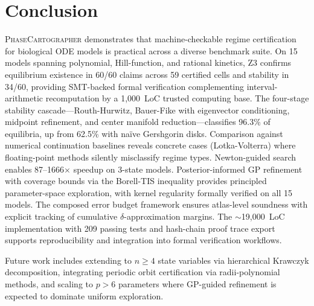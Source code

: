 \documentclass[11pt]{article}
\newcommand{\PC}{\textsc{PhaseCartographer}}
\begin{document}
\section{Conclusion}
\label{sec:conclusion}

\PC{} demonstrates that machine-checkable regime certification for biological ODE models is practical across a diverse benchmark suite.
On 15 models spanning polynomial, Hill-function, and rational kinetics, Z3 confirms equilibrium existence in 60/60 claims across 59 certified cells and stability in 34/60, providing SMT-backed formal verification complementing interval-arithmetic recomputation by a 1{,}000~LoC trusted computing base.
The four-stage stability cascade---Routh-Hurwitz, Bauer-Fike with eigenvector conditioning, midpoint refinement, and center manifold reduction---classifies 96.3\% of equilibria, up from 62.5\% with na\"ive Gershgorin disks.
Comparison against numerical continuation baselines reveals concrete cases (Lotka-Volterra) where floating-point methods silently misclassify regime types.
Newton-guided search enables 87--1666$\times$ speedup on 3-state models.
Posterior-informed GP refinement with coverage bounds via the Borell-TIS inequality provides principled parameter-space exploration, with kernel regularity formally verified on all 15 models.
The composed error budget framework ensures atlas-level soundness with explicit tracking of cumulative $\delta$-approximation margins.
The ${\sim}$19{,}000~LoC implementation with 209 passing tests and hash-chain proof trace export supports reproducibility and integration into formal verification workflows.

Future work includes extending to $n \geq 4$ state variables via hierarchical Krawczyk decomposition, integrating periodic orbit certification via radii-polynomial methods, and scaling to $p > 6$ parameters where GP-guided refinement is expected to dominate uniform exploration.
\end{document}

